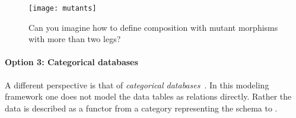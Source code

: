 \begin{figure}[h]
  \centering
  \texttt{[image: mutants]}
  \caption{Can you imagine how to define
  composition with mutant morphisms
  with more than two legs?}
\end{figure}

\paragraph{Option 3: Categorical databases}

A different perspective is that of \emph{categorical databases}~\cite{spivak2019categorical}. In this modeling framework
one does not model the data tables as relations directly.
Rather the data is described as a functor
from a category representing the schema
to \Set.

